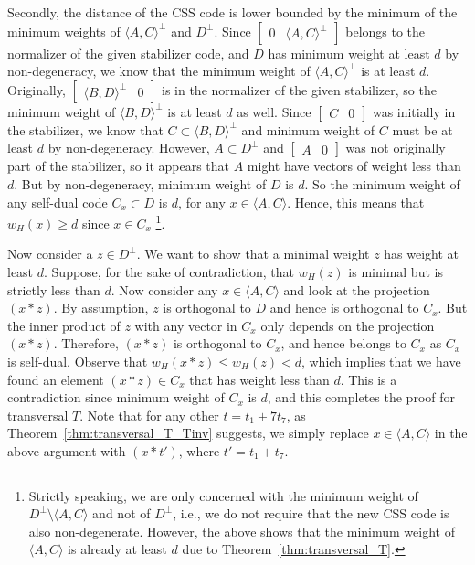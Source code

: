 \documentclass[twoside,romanappendices]{IEEEtran}
\begin{document}
Secondly, the distance of the CSS code is lower bounded by the minimum of the minimum weights of $\langle A,C \rangle^{\perp}$ and $D^{\perp}$. 
Since $\begin{bmatrix} 0 & \langle A,C \rangle^{\perp} \end{bmatrix}$ belongs to the normalizer of the given stabilizer code, and $D$ has minimum weight at least $d$ by non-degeneracy, we know that the minimum weight of $\langle A,C \rangle^{\perp}$ is at least $d$. 
Originally, $\begin{bmatrix} \langle B,D \rangle^{\perp} & 0 \end{bmatrix}$ is in the normalizer of the given stabilizer, so the minimum weight of $\langle B,D \rangle^{\perp}$ is at least $d$ as well. 
Since $\begin{bmatrix} C & 0 \end{bmatrix}$ was initially in the stabilizer, we know that $C \subset \langle B,D \rangle^{\perp}$ and minimum weight of $C$ must be at least $d$ by non-degeneracy. 
However, $A \subset D^{\perp}$ and $\begin{bmatrix} A & 0 \end{bmatrix}$ was not originally part of the stabilizer, so it appears that $A$ might have vectors of weight less than $d$. 
But by non-degeneracy, minimum weight of $D$ is $d$. 
So the minimum weight of any self-dual code $C_x \subset D$ is $d$, for any $x \in \langle A,C \rangle$. 
Hence, this means that $w_H(x) \geq d$ since $x \in C_x$
\footnote{Strictly speaking, we are only concerned with the minimum weight of $D^{\perp} \setminus \langle A, C \rangle$ and not of $D^{\perp}$, i.e., we do not require that the new CSS code is also non-degenerate. 
However, the above shows that the minimum weight of $\langle A,C \rangle$ is already at least $d$ due to Theorem~\ref{thm:transversal_T}.}.

Now consider a $z \in D^{\perp}$. 
We want to show that a minimal weight $z$ has weight at least $d$. 
Suppose, for the sake of contradiction, that $w_H(z)$ is minimal but is strictly less than $d$.
Now consider any $x \in \langle A,C \rangle$ and look at the projection $(x \ast z)$. 
By assumption, $z$ is orthogonal to $D$ and hence is orthogonal to $C_x$. 
But the inner product of $z$ with any vector in $C_x$ only depends on the projection $(x \ast z)$. 
Therefore, $(x \ast z)$ is orthogonal to $C_x$, and hence belongs to $C_x$ as $C_x$ is self-dual.
Observe that $w_H(x \ast z) \leq w_H(z) < d$, which implies that we have found an element $(x \ast z) \in C_x$ that has weight less than $d$. 
This is a contradiction since minimum weight of $C_x$ is $d$, and this completes the proof for transversal $T$.
Note that for any other $t = t_1 + 7t_7$, as Theorem~\ref{thm:transversal_T_Tinv} suggests, we simply replace $x \in \langle A,C \rangle$ in the above argument with $(x \ast t')$, where $t' = t_1 + t_7$.  \hfill \IEEEQEDhere
\end{document}
